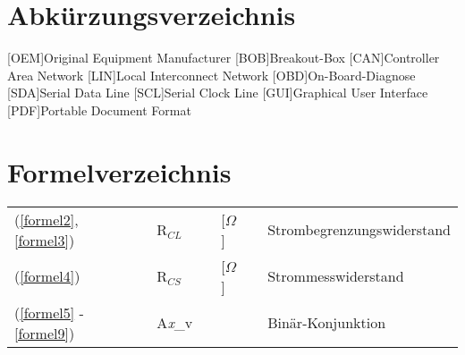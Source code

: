 \documentclass[a4paper,oneside,12pt]{report}
\renewcommand{\lstlistingname}{Programmcode}
\renewcommand{\lstlistlistingname}{\lstlistingname}
\begin{document}
	
	
	
	\clearpage
	\listoffigures
	
	
	
	\clearpage
	\renewcommand{\lstlistingname}{Programmcodeverzeichnis}
	\lstlistoflistings
	\renewcommand{\lstlistlistingname}{\lstlistingname}
	
	
	
	\chapter*{Abkürzungsverzeichnis}
		\vspace{1.0cm}
		\begin{acronym}[SEPSEP]
			[OEM]{Original Equipment Manufacturer}
			[BOB]{Breakout-Box}
			[CAN]{Controller Area Network}
			[LIN]{Local Interconnect Network}
			[OBD]{On-Board-Diagnose}	
			[SDA]{Serial Data Line}
			[SCL]{Serial Clock Line}
			[GUI]{Graphical User Interface}
			[PDF]{Portable Document Format}
		\end{acronym}
	
	
	
	\chapter*{Formelverzeichnis}
		\vspace{1.0cm}
		\begin{center}
			\begin{tabularx}{\textwidth}{lXlXlXl}
				
				(\ref{formel2}, \ref{formel3})	& & R$_{CL}$ & & [$\Omega$]	& & Strombegrenzungswiderstand\\
				
				(\ref{formel4})	& & R$_{CS}$ & & [$\Omega$]	& & Strommesswiderstand\\
				
				(\ref{formel5} - \ref{formel9})	& & A\textit{x}\_v & & & & Binär-Konjunktion\\
				
			\end{tabularx}
		\end{center}
	
\end{document}
